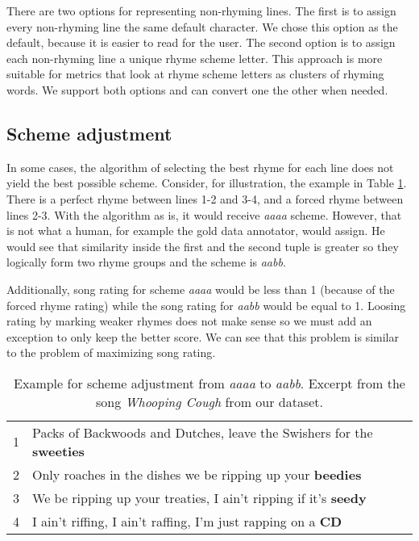  There are two options for representing non-rhyming lines. The first is to assign every non-rhyming line the same default character. We chose this option as the default, because it is easier to read for the user. The second option is to assign each non-rhyming line a unique rhyme scheme letter. This approach is more suitable for metrics that look at rhyme scheme letters as clusters of rhyming words. We support both options and can convert one the other when needed.

\subsection{Scheme adjustment}
In some cases, the algorithm of selecting the best rhyme for each line does not yield the best possible scheme. Consider, for illustration, the example in Table \ref{scheme_adjustment}. There is a perfect rhyme between lines 1-2 and 3-4, and a forced rhyme between lines 2-3. With the algorithm as is, it would receive \textit{aaaa} scheme. However, that is not what a human, for example the gold data annotator, would assign. He would see that similarity inside the first and the second tuple is greater so they logically form two rhyme groups and the scheme is \textit{aabb}. 

Additionally, song rating for scheme \textit{aaaa} would be less than 1 (because of the forced rhyme rating) while the song rating for \textit{aabb} would be equal to 1. Loosing rating by marking weaker rhymes does not make sense so we must add an exception to only keep the better score. We can see that this problem is similar to the problem of maximizing song rating. 

\begin{table}
	\begin{tabular}{l l}
		1&Packs of Backwoods and Dutches, leave the Swishers for the \textbf{sweeties}  \\
		2&Only roaches in the dishes we be ripping up your \textbf{beedies}  \\
		3&We be ripping up your treaties, I ain't ripping if it's \textbf{seedy}  \\
		4&I ain't riffing, I ain't raffing, I'm just rapping on a \textbf{CD} \\
	\end{tabular}
	\caption[Scheme adjustment example.]{Example for scheme adjustment from \textit{aaaa} to \textit{aabb}. Excerpt from the song \textit{Whooping Cough} from  our dataset.}
	\label{scheme_adjustment}
\end{table}

